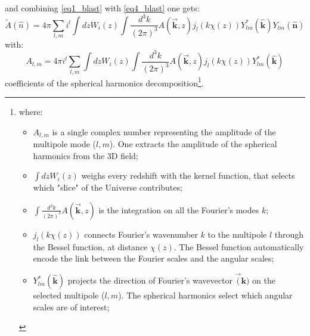 and combining \ref{eq1_blast} with \ref{eq4_blast} one gets:
\begin{equation}
    \tilde{A}(\hat{n}) = 4\pi \sum_{l,m} i^l \int dz W_i(z) \int \frac{d^3k}{(2\pi)^3} A(\vec{\textbf{k}}, z) j_l(k\chi(z)) Y^{*}_{lm}(\hat{\textbf{k}}) Y_{lm}(\hat{\textbf{n}})
\label{eq5_blast}
\end{equation}
with:
\begin{equation}
    A_{l,m} = 4\pi i^l \sum_{l,m} \int dz W_i(z) \int \frac{d^3k}{(2\pi)^3} A(\vec{\textbf{k}}, z) j_l(k\chi(z)) Y^{*}_{lm}(\hat{\textbf{k}})
\label{eq6_blast}
\end{equation}
coefficients of the spherical harmonics decomposition\footnote{
where:
\begin{itemize}
    \item $A_{l,m}$ is a single complex number representing the amplitude of the multipole mode ($l,m$). One extracts the amplitude of the spherical harmonics from the 3D field;
    \item $\int dz W_i(z)$ weighs every redshift with the kernel function, that selects which "slice" of the Universe contributes;
    \item $\int \frac{d^3k}{(2\pi)^3} A(\vec{\textbf{k}}, z)$ is the integration on all the Fourier's modes $k$;
    \item $j_l(k\chi(z))$ connects Fourier's wavenumber $k$ to the multipole $l$ through the Bessel function, at distance $\chi(z)$. The Bessel function automatically encode the link between the Fourier scales and the angular scales;
    \item $Y^{*}_{lm}(\hat{\textbf{k}})$ projects the direction of Fourier's wavevector $\vec(\textbf{k})$ on the selected multipole ($l,m$). The spherical harmonics select which angular scales are of interest;
    \end{itemize}
}. \\
